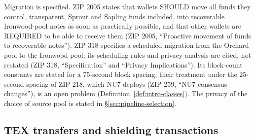 \documentclass[11pt,a4paper]{article}
\theoremstyle{definition}
\begin{document}
Migration is specified. ZIP 2005 states that wallets SHOULD move all funds
they control, transparent, Sprout and Sapling funds included, into
recoverable Ironwood-pool notes as soon as practically possible, and that
other wallets are REQUIRED to be able to receive them (ZIP 2005,
``Proactive movement of funds to recoverable notes''). ZIP 318 specifies a
scheduled migration from the Orchard pool to the Ironwood pool; its
scheduling rules and privacy analysis are cited, not restated (ZIP 318,
``Specification'' and ``Privacy Implications''). Its block-count constants
are stated for a $75$-second block spacing; their treatment under the
$25$-second spacing of ZIP 218, which NU7 deploys (ZIP 259, ``NU7 consensus
changes''), is an open problem (Definition~\ref{def:intro-classes}). The
privacy of the choice of source pool is stated in
\S\ref{sec:pipeline-selection}.

\subsection{TEX transfers and shielding transactions}\label{sec:pipeline-tex}
\end{document}
